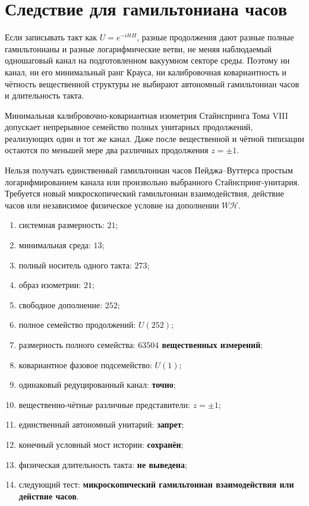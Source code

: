 \section{Следствие для гамильтониана часов}

Если записывать такт как $U=e^{-i\delta t H}$, разные продолжения дают
разные полные гамильтонианы и разные логарифмические ветви, не меняя
наблюдаемый одношаговый канал на подготовленном вакуумном секторе среды.
Поэтому ни канал, ни его минимальный ранг Крауса, ни калибровочная ковариантность
и чётность вещественной структуры не выбирают автономный гамильтониан часов и длительность такта.

\begin{theorem}
Минимальная калибровочно-ковариантная изометрия Стайнспринга Тома VIII допускает
непрерывное семейство полных унитарных продолжений, реализующих один и тот
же канал. Даже после вещественной и чётной типизации остаются по меньшей мере два
различных продолжения $z=\pm1$.
\end{theorem}

\begin{nogocriterion}
Нельзя получать единственный гамильтониан часов Пейджа--Вуттерса простым
логарифмированием канала или произвольно выбранного Стайнспринг-унитария.
Требуется новый микроскопический гамильтониан взаимодействия, действие часов
или независимое физическое условие на дополнении $W\mathcal H$.
\end{nogocriterion}

\begin{protocol}
\begin{enumerate}
 \item системная размерность: \textbf{$21$};
 \item минимальная среда: \textbf{$13$};
 \item полный носитель одного такта: \textbf{$273$};
 \item образ изометрии: \textbf{$21$};
 \item свободное дополнение: \textbf{$252$};
 \item полное семейство продолжений: \textbf{$U(252)$};
 \item размерность полного семейства: \textbf{$63504$ вещественных измерений};
 \item ковариантное фазовое подсемейство: \textbf{$U(1)$};
 \item одинаковый редуцированный канал: \textbf{точно};
 \item вещественно-чётные различные представители: \textbf{$z=\pm1$};
 \item единственный автономный унитарий: \textbf{запрет};
 \item конечный условный мост истории: \textbf{сохранён};
 \item физическая длительность такта: \textbf{не выведена};
 \item следующий тест: \textbf{микроскопический гамильтониан взаимодействия
 или действие часов}.
\end{enumerate}
\end{protocol}

